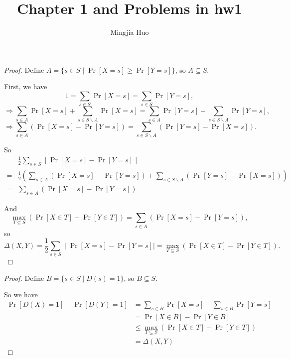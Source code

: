 \documentclass[12pt]{article}
\newenvironment{problem}[2][Problem]{\begin{trivlist}
\item[\hskip \labelsep {\bfseries #1}\hskip \labelsep {\bfseries #2.}]}{\end{trivlist}}
\begin{document}
 
 
\title{Chapter 1 and Problems in hw1}
\author{Mingjia Huo}
\date{}
\maketitle

\begin{problem}{1.Part A}
\begin{proof}
Define $A=\{s\in S\mid \Pr[X=s]\ge \Pr[Y=s]\}$, so $A\subseteq S$.

First, we have
$$1=\sum_{s\in S}\Pr[X=s]=\sum_{s\in S}\Pr[Y=s],$$
$$\Rightarrow \sum_{s\in A}\Pr[X=s]+\sum_{s\in S\backslash A}\Pr[X=s] =\sum_{s\in A}\Pr[Y=s]+\sum_{s\in S\backslash A}\Pr[Y=s], $$
$$\Rightarrow\sum_{s\in A}(\Pr[X=s]-\Pr[Y=s]) = \sum_{s\in S\backslash A}(\Pr[Y=s]-\Pr[X=s]). $$

So 
\begin{align*}
&\frac 12\sum_{s\in S}\mid \Pr[X=s]-\Pr[Y=s]\mid\\
=&\frac12\left(\sum_{s\in A}(\Pr[X=s]-\Pr[Y=s])+\sum_{s\in S\backslash A}(\Pr[Y=s]-\Pr[X=s]) \right)\\
=&\sum_{s\in A}(\Pr[X=s]-\Pr[Y=s])
\end{align*}

And $$\max\limits_{T\subseteq S}(\Pr[X\in T]-\Pr[Y\in T])=\sum\limits_{s\in A}(\Pr[X=s]-\Pr[Y=s]),$$ so 
$$\Delta(X,Y)=\frac 12\sum_{s\in S}\mid \Pr[X=s]-\Pr[Y=s]\mid=\max\limits_{T\subseteq S}(\Pr[X\in T]-\Pr[Y\in T]).$$
\end{proof}
\end{problem}

\begin{problem}{1.Part B}
\begin{proof}
Define $B=\{s\in S\mid D(s)=1\}$, so $B\subseteq S$.

So we have
\begin{align*}
\Pr[D(X)=1]-\Pr[D(Y)=1]&=\sum_{s\in B}\Pr[X=s]-\sum_{s\in B}\Pr[Y=s] \\
&=\Pr[X\in B]-\Pr[Y\in B]\\
&\le \max\limits_{T\subseteq S}(\Pr[X\in T]-\Pr[Y\in T])\\
&=\Delta(X,Y)
\end{align*}
\end{proof}
\end{problem}
\end{document}
